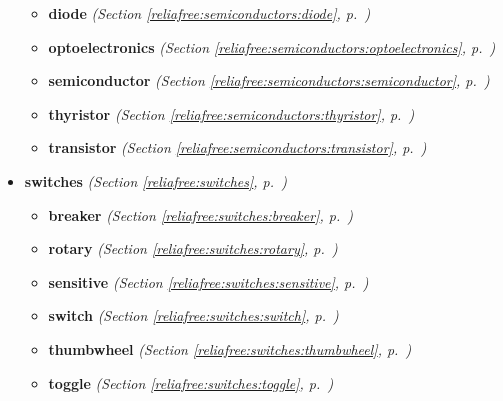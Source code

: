 \begin{itemize}
  \begin{itemize}
\setlength{\parskip}{0ex}
    \item \textbf{diode}
  \textit{(Section \ref{reliafree:semiconductors:diode}, p.~\pageref{reliafree:semiconductors:diode})}

    \item \textbf{optoelectronics}
  \textit{(Section \ref{reliafree:semiconductors:optoelectronics}, p.~\pageref{reliafree:semiconductors:optoelectronics})}

    \item \textbf{semiconductor}
  \textit{(Section \ref{reliafree:semiconductors:semiconductor}, p.~\pageref{reliafree:semiconductors:semiconductor})}

    \item \textbf{thyristor}
  \textit{(Section \ref{reliafree:semiconductors:thyristor}, p.~\pageref{reliafree:semiconductors:thyristor})}

    \item \textbf{transistor}
  \textit{(Section \ref{reliafree:semiconductors:transistor}, p.~\pageref{reliafree:semiconductors:transistor})}

  \end{itemize}
\item \textbf{switches}
  \textit{(Section \ref{reliafree:switches}, p.~\pageref{reliafree:switches})}

  \begin{itemize}
\setlength{\parskip}{0ex}
    \item \textbf{breaker}
  \textit{(Section \ref{reliafree:switches:breaker}, p.~\pageref{reliafree:switches:breaker})}

    \item \textbf{rotary}
  \textit{(Section \ref{reliafree:switches:rotary}, p.~\pageref{reliafree:switches:rotary})}

    \item \textbf{sensitive}
  \textit{(Section \ref{reliafree:switches:sensitive}, p.~\pageref{reliafree:switches:sensitive})}

    \item \textbf{switch}
  \textit{(Section \ref{reliafree:switches:switch}, p.~\pageref{reliafree:switches:switch})}

    \item \textbf{thumbwheel}
  \textit{(Section \ref{reliafree:switches:thumbwheel}, p.~\pageref{reliafree:switches:thumbwheel})}

    \item \textbf{toggle}
  \textit{(Section \ref{reliafree:switches:toggle}, p.~\pageref{reliafree:switches:toggle})}


\end{itemize}
\end{itemize}
